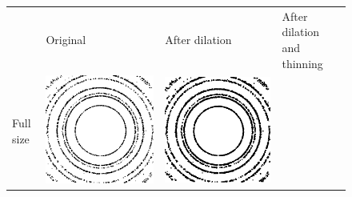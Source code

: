 \documentclass[preprint]{iucr}              %
\begin{document}
\begin{figure}
\centering

\begin{tabular}{>{\centering\arraybackslash}m{.1\linewidth}>{\centering\arraybackslash}m{.25\linewidth}>{\centering\arraybackslash}m{.25\linewidth}>{\centering\arraybackslash}m{.25\linewidth}}
& Original & After dilation & After dilation and thinning
\\
Full size&
\includegraphics[width=\linewidth]{Detail/NorSmoothFull.png}&
\includegraphics[width=\linewidth]{Detail/DilatedFull.png}&

\end{tabular}
\end{figure}
\end{document}
